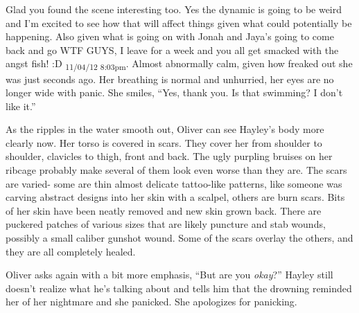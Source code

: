 {Glad you found the scene interesting too. Yes the dynamic is going to be weird and I'm excited to see how that will affect things given what could potentially be happening.  Also given what is going on with Jonah and Jaya's going to come back and go WTF GUYS, I leave for a week and you all get smacked with the angst fish! :D \textsubscript{11/04/12 8:03pm}}.  Almost abnormally calm, given how freaked out she was just seconds ago.  Her breathing is normal and unhurried, her eyes are no longer wide with panic.  She smiles, ``Yes, thank you.  Is that swimming?  I don't like it.''



As the ripples in the water smooth out, Oliver can see Hayley's body more clearly now.  Her torso is covered in scars.  They cover her from shoulder to shoulder, clavicles to thigh, front and back.  The ugly purpling bruises on her ribcage probably make several of them look even worse than they are.  The scars are varied- some are thin almost delicate tattoo-like patterns, like someone was carving abstract designs into her skin with a scalpel, others are burn scars.  Bits of her skin have been neatly removed and new skin grown back.  There are puckered patches of various sizes that are likely puncture and stab wounds, possibly a small caliber gunshot wound.  Some of the scars overlay the others, and they are all completely healed.



Oliver asks again with a bit more emphasis, ``But are you \textit{okay}?'' Hayley still doesn't realize what he's talking about and tells him that the drowning reminded her of her nightmare and she panicked.  She apologizes for panicking.



